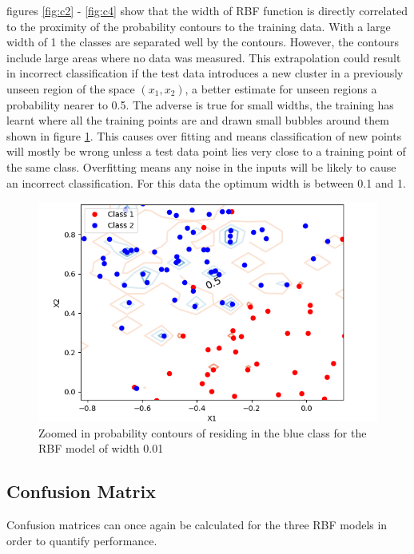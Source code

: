\documentclass[twoside,twocolumn]{article}
\begin{document}
figures \ref{fig:c2} - \ref{fig:c4} show that the width of RBF function is directly correlated to the proximity of the probability contours to the training data. With a large width of 1 the classes are separated well by the contours. However, the contours include large areas where no data was measured. This extrapolation could result in incorrect classification if the test data introduces a new cluster in a previously unseen region of the space $(x_1,x_2)$, a better estimate for unseen regions a probability nearer to 0.5. The adverse is true for small widths, the training has learnt where all the training points are and drawn small bubbles around them shown in figure \ref{fig:c5}. This causes over fitting and means classification of new points will mostly be wrong unless a test data point lies very close to a training point of the same class. Overfitting means any noise in the inputs will be likely to cause an incorrect classification. For this data the optimum width is between 0.1 and 1.
\begin{figure}[h]
  \centering
    \includegraphics[width=\linewidth]{l=0-01contourzoom}
  \caption{Zoomed in probability contours of residing in the blue class for the RBF model of width 0.01}
  \label{fig:c5}
\end{figure}
\subsection{Confusion Matrix}
Confusion matrices can once again be calculated for the three RBF models in order to quantify performance. 
\newline 
\end{document}

